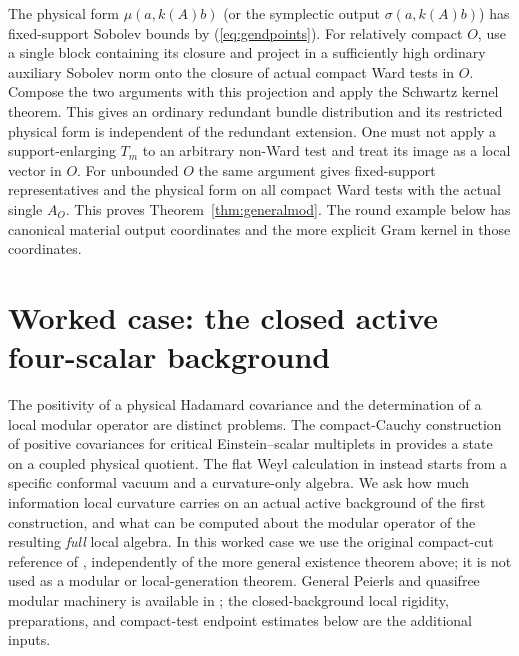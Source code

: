 \documentclass[11pt]{article}
\begin{document}
The physical form $\mu(a,k(A)b)$ (or the symplectic output
$\sigma(a,k(A)b)$) has fixed-support Sobolev bounds by
(\ref{eq:gendpoints}). For relatively compact $O$, use a single
block containing its closure and project in a sufficiently high
ordinary auxiliary Sobolev norm onto the closure of actual
compact Ward tests in $O$. Compose the two arguments with this
projection and apply the Schwartz kernel theorem. This gives
an ordinary redundant bundle distribution and its restricted
physical form is independent of the redundant extension.
One must not apply a support-enlarging $T_m$ to an arbitrary
non-Ward test and treat its image as a local vector in $O$.
For unbounded $O$ the same argument gives fixed-support
representatives and the physical form on all compact Ward tests
with the actual single $A_O$. This proves
Theorem~\ref{thm:generalmod}. The round example below has
canonical material output coordinates and the more explicit
Gram kernel in those coordinates.



\section{Worked case: the closed active four-scalar background}\label{sec:round}

The positivity of a physical Hadamard covariance and the determination of a local modular operator are distinct problems. The compact-Cauchy construction of positive covariances for critical Einstein--scalar multiplets in \cite{p09} provides a state on a coupled physical quotient. The flat Weyl calculation in \cite{p21} instead starts from a specific conformal vacuum and a curvature-only algebra. We ask how much information local curvature carries on an actual active background of the first construction, and what can be computed about the modular operator of the resulting \emph{full} local algebra. In this worked case we use the original compact-cut reference of \cite{p09}, independently of the more general existence theorem above; it is not used as a modular or local-generation theorem. General Peierls and quasifree modular machinery is available in \cite{hack,khavpeierls,longo}; the closed-background local rigidity, preparations, and compact-test endpoint estimates below are the additional inputs.
\end{document}
